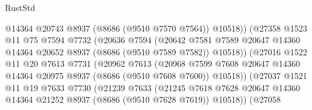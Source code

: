 \begin{lexlean}{RustStd}
\begin{coremodule}
                                  @14364
                                  @20743
                                  @8937
                                  (@8686 (@9510 @7570 @7564))
                                  @10518))
                              (@27358
                                @1523
                                @11
                                @75
                                @7594
                                @7732
                                (@20636
                                  @7594
                                  (@20642
                                    @7581
                                    @7589
                                    @20647
                                    @14360
                                    @14364
                                    @20652
                                    @8937
                                    (@8686 (@9510 @7589 @7582))
                                    @10518))
                                (@27016
                                  @1522
                                  @11
                                  @20
                                  @7613
                                  @7731
                                  (@20962
                                    @7613
                                    (@20968
                                      @7599
                                      @7608
                                      @20647
                                      @14360
                                      @14364
                                      @20975
                                      @8937
                                      (@8686 (@9510 @7608 @7600))
                                      @10518))
                                  (@27037
                                    @1521
                                    @11
                                    @19
                                    @7633
                                    @7730
                                    (@21239
                                      @7633
                                      (@21245
                                        @7618
                                        @7628
                                        @20647
                                        @14360
                                        @14364
                                        @21252
                                        @8937
                                        (@8686 (@9510 @7628 @7619))
                                        @10518))
                                    (@27058

\end{coremodule}
\end{lexlean}
